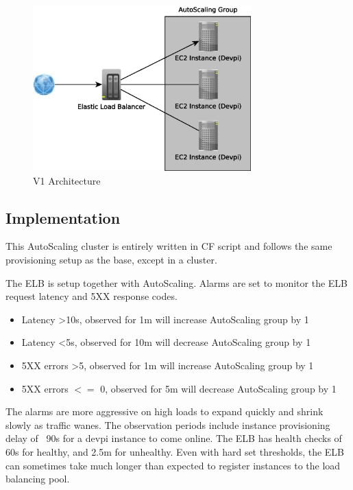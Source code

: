 \documentclass[12pt, letterpaper]{article}
\begin{document}
\begin{figure}[H]
    \caption{V1 Architecture}
    \centering
    \includegraphics[width=0.75\textwidth]{figures/v1_arch.eps}
\end{figure}

\subsection{Implementation}
This AutoScaling cluster is entirely written in CF script and follows the same provisioning setup as the base, except in a cluster.

The ELB is setup together with AutoScaling. Alarms are set to monitor the ELB request latency and 5XX response codes.

\begin{itemize}
    \item Latency \textgreater 10s, observed for 1m will increase AutoScaling group by 1
    \item Latency \textless 5s, observed for 10m will decrease AutoScaling group by 1
    \item 5XX errors \textgreater 5, observed for 1m will increase AutoScaling group by 1
    \item 5XX errors $<=$ 0, observed for 5m will decrease AutoScaling group by 1
\end{itemize}

The alarms are more aggressive on high loads to expand quickly and shrink slowly as traffic wanes. The observation periods
include instance provisioning delay of ~90s for a devpi instance to come online. The ELB has health checks of 60s for healthy, and
2.5m for unhealthy. Even with hard set thresholds, the ELB can sometimes take much longer than expected to register instances 
to the load balancing pool.
\end{document}
